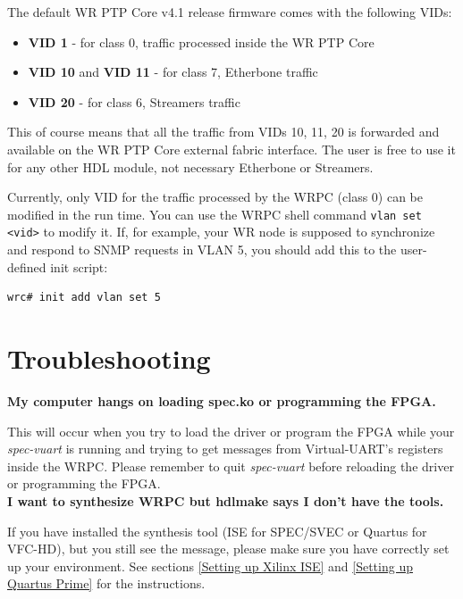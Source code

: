 \documentclass[a4paper, 12pt]{article}
\renewcommand{\_}{\underscore\allowbreak}
\begin{document}
The default WR PTP Core v4.1 release firmware comes with the following VIDs:
\begin{itemize}
  \item \textbf{VID 1} - for class 0, traffic processed inside the WR PTP Core
  \item \textbf{VID 10} and \textbf{VID 11} - for class 7, Etherbone traffic
  \item \textbf{VID 20} - for class 6, Streamers traffic
\end{itemize}
This of course means that all the traffic from VIDs 10, 11, 20 is forwarded and
available on the WR PTP Core external fabric interface. The user is free to use
it for any other HDL module, not necessary Etherbone or Streamers.

Currently, only VID for the traffic processed by the WRPC (class 0) can be
modified in the run time. You can use the WRPC shell command
\texttt{vlan set <vid>} to modify it. If, for example, your WR node is supposed
to synchronize and respond to SNMP requests in VLAN 5, you should add this to
the user-defined init script:
\begin{lstlisting}
wrc# init add vlan set 5
\end{lstlisting}

\newpage






\newpage
\section{Troubleshooting}
\label{Troubleshooting}

\textbf{My computer hangs on loading spec.ko or programming the FPGA.}

This will occur when you try to load the driver or program the FPGA while your
\textit{spec-vuart} is running and trying to get messages from Virtual-UART's
registers inside the WRPC. Please remember to quit \textit{spec-vuart} before
reloading the driver or programming the FPGA.\\

\noindent \textbf{I want to synthesize WRPC but hdlmake says I don't have the
tools.}

If you have installed the synthesis tool (ISE for SPEC/SVEC or Quartus for
VFC-HD), but you still see the message, please make sure you have correctly set
up your environment. See sections \ref{Setting up Xilinx ISE} and \ref{Setting
up Quartus Prime} for the instructions.\\
\end{document}

